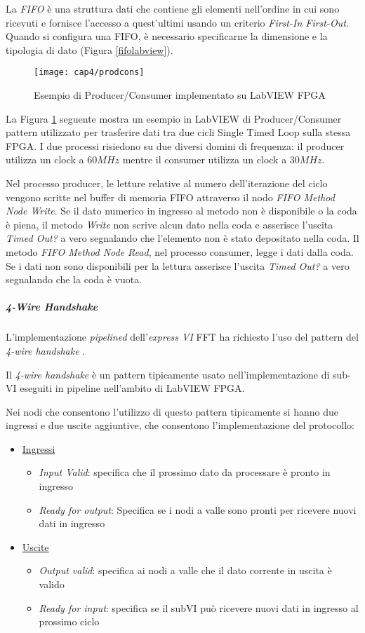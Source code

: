 La \textit{FIFO} è una struttura dati che contiene gli elementi nell'ordine in cui sono ricevuti e fornisce l'accesso a quest'ultimi usando un criterio \textit{First-In First-Out}. Quando si configura una FIFO, è necessario specificarne la dimensione e la tipologia di dato (Figura \ref{fifolabview}).
\begin{figure}  
  \begin{center}
    \texttt{[image: cap4/prodcons]}
    \caption{Esempio di Producer/Consumer implementato su LabVIEW FPGA}
    \label{prodcons}
  \end{center}
\end{figure}

La Figura \ref{prodcons} seguente mostra un esempio in LabVIEW di Producer/Consumer pattern utilizzato per trasferire dati tra due cicli Single Timed Loop sulla stessa FPGA. I due processi risiedono su due diversi domini di frequenza: il producer utilizza un clock a $60 MHz$ mentre il consumer utilizza un clock a $30 MHz$. 

Nel processo producer, le letture relative al numero dell'iterazione del ciclo vengono scritte nel buffer di memoria FIFO attraverso il nodo \textit{FIFO Method Node Write}. Se il dato numerico in ingresso al metodo non è disponibile o la coda è piena, il metodo \textit{Write} non scrive alcun dato nella coda e asserisce l'uscita \textit{Timed Out?} a vero segnalando che l'elemento non è stato depositato nella coda. Il metodo \textit{FIFO Method Node Read}, nel processo consumer, legge i dati dalla coda. Se i dati non sono disponibili per la lettura asserisce l'uscita \textit{Timed Out?} a vero segnalando che la coda è vuota.

\subparagraph{4-Wire Handshake}
L'implementazione \textit{pipelined} dell'\textit{express VI} FFT ha richiesto l'uso del pattern del \textit{4-wire handshake} \cite{4wirehs}.

Il \textit{4-wire handshake} è un pattern tipicamente usato nell'implementazione di sub-VI eseguiti in pipeline nell'ambito di LabVIEW FPGA.

Nei nodi che consentono l'utilizzo di questo pattern tipicamente si hanno due ingressi e due uscite aggiuntive, che consentono l'implementazione del protocollo:
\begin{itemize}
	\item \underline{Ingressi}
	\begin{itemize}
	\item \textit{Input Valid}: specifica che il prossimo dato da processare è pronto in ingresso
	\item \textit{Ready for output}: Specifica se i nodi a valle sono pronti per ricevere nuovi dati in ingresso
	\end{itemize}
	\item \underline{Uscite}
	\begin{itemize}
	\item \textit{Output valid}: specifica ai nodi a valle che il dato corrente in uscita è valido
	\item \textit{Ready for input}: specifica se il subVI può ricevere nuovi dati in ingresso al prossimo ciclo
	\end{itemize}
\end{itemize}

